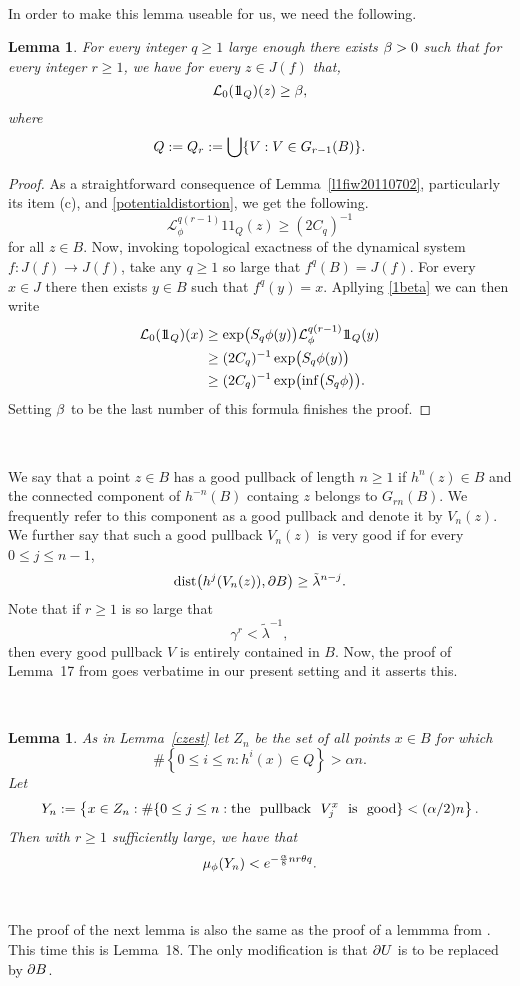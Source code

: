\documentclass[12pt]{amsart}
\numberwithin{equation}{section}
\newcommand{\beq}{\begin{equation}}
\newcommand{\eeq}{\end{equation}}
\newcommand{\blem}{\begin{lem}}
\newcommand{\elem}{\end{lem}}
\newtheorem{lem}[thm]{Lemma}
\def\1{1\!\!1}
\def\dist{\text{{\rm dist}}}  \def\Dist{\text{{\rm Dist}}}
\def\L{{\mathcal L}}           \def\M{\mathcal M}        \def\Pa{{\mathcal P}}
\def\g{\gamma}                \def\Ga{\Gamma}           \def\l{\lambda}
\def\({\bigl(}                \def\){\bigr)}
\def\lt{\left}                \def\rt{\right}
\begin{document}
\

\fr In order to make this lemma useable for us, we need the following.

\blem\label{l520110702}
For every integer $q\ge 1$ large enough there exists $\beta>0$ such that
for every integer $r\ge 1$, we have for every $z\in J(f)$ that,
$$
\L_0(\1_Q)(z)\ge \b,
$$
where 
$$
Q:=Q_r:=\bigcup\{V:V\in G_{r-1}(B)\}.
$$
\elem

\begin{proof}
As a straightforward consequence of Lemma~\ref{l1fiw20110702},
particularly its item (c), and \eqref{potentialdistortion}, we get the
following.
\beq\label{1beta}
\L_\phi^{q(r-1)}\1_Q(z)\ge (2C_q)^{-1}
\eeq
for all $z\in B$. Now, invoking topological exactness of the dynamical
system $f:J(f)\to J(f)$, take any $q\ge 1$ so large that $f^q(B)=J(f)$. For
every $x\in J$ there then exists $y\in B$ such that
$f^q(y)=x$. Apllying \eqref{1beta} we can then write
$$
\aligned
\L_0(\1_Q)(x)
&\ge \exp\(S_q\phi(y)\)\L_\phi^{q(r-1)}\1_Q(y) \\
&\ge (2C_q)^{-1}\exp\(S_q\phi(y)\) \\
&\ge (2C_q)^{-1}\exp\(\inf\(S_q\phi\)\).
\endaligned
$$
Setting $\beta$ to be the last number of this formula finishes the proof.
\end{proof}

\

\fr We say that a point $z\in B$ has a good pullback of length $n\ge
1$ if $h^n(z)\in B$ and the connected component of $h^{-n}(B)$
containg $z$ belongs to $G_{rn}(B)$. We frequently refer to this
component as a good pullback and denote it by $V_n(z)$. We further say
that such a good pullback $V_n(z)$ is very good if for every $0\le j\le n-1$,
$$
\dist\(h^j(V_n(z)),\bd B\)\ge \tilde\l^{n-j}.
$$
Note that if $r\ge 1$ is so large that 
$$
\g^r< \tilde\l^{-1},
$$
then every good pullback $V$ is entirely contained in $B$. Now, the
proof of Lemma~17 from \cite{SUZ1} goes verbatime in our present
setting and it asserts this. 

\

\blem\label{Yn}
As in Lemma~\ref{czest} let $Z_n$ be the set of all points $x\in B$ for which
$$
\# \left\{0\le i\le n:h^i(x)\in Q\right\}>\alpha n.
$$
Let
$$
Y_n
:=\lt\{x\in Z_n:\#\{0\le j\le n:{\rm the ~~pullback~~}V^x_j{\rm ~~is~~
     good}\}<(\alpha/2)n\rt\}.
$$
Then with $r\ge 1$ sufficiently large, we have that 
$$
\mu_\phi(Y_n)<e^{-{\alpha\over 8}nr\theta q}.
$$
\elem

\

\fr The proof of the next lemma is also the same as the proof of a lemmma
from \cite{SUZ1}. This time this is Lemma~18. The only modification is
that $\partial U$ is to be replaced by $\partial B$. 
\end{document}
